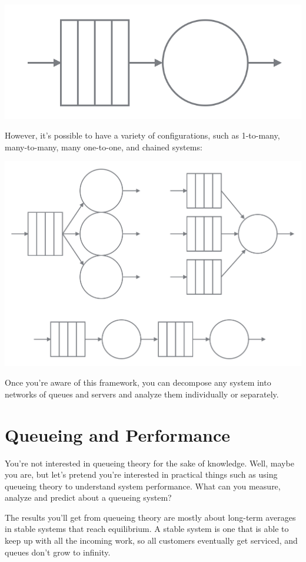 \documentclass{vivid_layout_pdf}
\begin{document}
\begin{center}
\includegraphics[width=.75\linewidth]{queue-and-server}
\end{center}

However, it's possible to have a variety of configurations, such as 1-to-many, many-to-many, many one-to-one, and chained systems:

\begin{center}
\includegraphics[width=.75\linewidth]{queue-configurations}
\end{center}

Once you're aware of this framework, you can decompose any system into networks of queues and servers and analyze them individually or separately.

\section{Queueing and Performance}

You're not interested in queueing theory for the sake of knowledge. Well, maybe you are, but let's pretend you're interested in practical things such as using queueing theory to understand system performance. What can you measure, analyze and predict about a queueing system?

The results you'll get from queueing theory are mostly about long-term averages in stable systems that reach equilibrium. A stable system is one that is able to keep up with all the incoming work, so all customers eventually get serviced, and queues don't grow to infinity.
\end{document}
